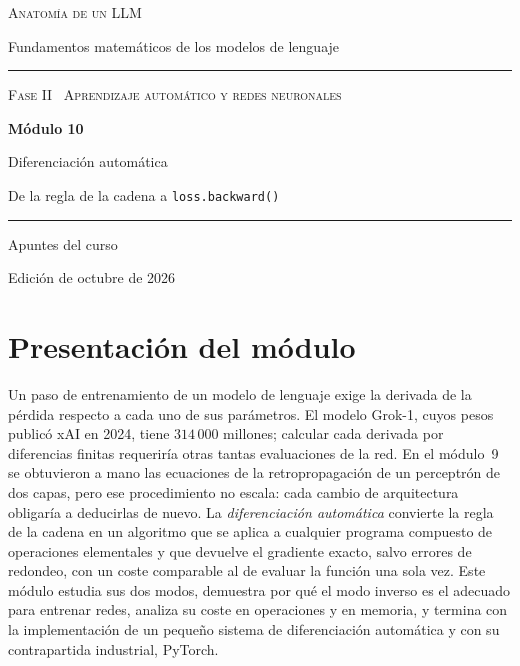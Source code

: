 \documentclass[11pt,a4paper,twoside,openany]{book}
\begin{document}
\frontmatter
\begin{titlepage}
\centering
\vspace*{2.5cm}
{\large\scshape Anatomía de un LLM}\par
\vspace{0.4cm}
{\normalsize Fundamentos matemáticos de los modelos de lenguaje}\par
\vspace{2.2cm}
\rule{\textwidth}{0.8pt}\par\vspace{0.5cm}
{\small\scshape Fase II \textperiodcentered\ Aprendizaje automático y redes neuronales}\par\vspace{0.3cm}
{\Huge\bfseries Módulo 10\par}\vspace{0.3cm}
{\LARGE Diferenciación automática\par}
\vspace{0.2cm}
{\large De la regla de la cadena a \texttt{loss.backward()}\par}
\vspace{0.5cm}\rule{\textwidth}{0.4pt}\par
\vspace{1.6cm}
{\large Apuntes del curso}\par
\vfill
{\small Edición de octubre de 2026}\par
\end{titlepage}

\chapter*{Presentación del módulo}

Un paso de entrenamiento de un modelo de lenguaje exige la derivada de la pérdida respecto a cada uno de sus parámetros. El modelo Grok-1, cuyos pesos publicó xAI en 2024, tiene $314\,000$ millones; calcular cada derivada por diferencias finitas requeriría otras tantas evaluaciones de la red. En el módulo~9 se obtuvieron a mano las ecuaciones de la retropropagación de un perceptrón de dos capas, pero ese procedimiento no escala: cada cambio de arquitectura obligaría a deducirlas de nuevo. La \emph{diferenciación automática} convierte la regla de la cadena en un algoritmo que se aplica a cualquier programa compuesto de operaciones elementales y que devuelve el gradiente exacto, salvo errores de redondeo, con un coste comparable al de evaluar la función una sola vez. Este módulo estudia sus dos modos, demuestra por qué el modo inverso es el adecuado para entrenar redes, analiza su coste en operaciones y en memoria, y termina con la implementación de un pequeño sistema de diferenciación automática y con su contrapartida industrial, PyTorch.
\end{document}
